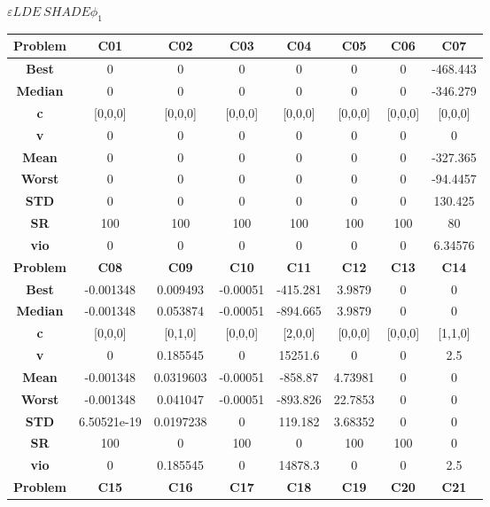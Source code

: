 \documentclass{IEEEtran}
\begin{document}
\begin{center}
$\varepsilon LDE\ SHADE \phi_1$\\
  \begin{tabular}{|c|c|c|c|c|c|c|c|}
    \hline 
    \textbf{Problem} & \textbf{C01} & \textbf{C02} & \textbf{C03} & \textbf{C04} & \textbf{C05} & \textbf{C06} & \textbf{C07} \\ 
    \hline\hline 
    \textbf{Best} & 0 & 0 & 0 & 0 & 0 & 0 & -468.443\\ 
    \textbf{Median} & 0 & 0 & 0 & 0 & 0 & 0 & -346.279\\ 
    \textbf{c} & [0,0,0] & [0,0,0] & [0,0,0] & [0,0,0] & [0,0,0] & [0,0,0] & [0,0,0]\\ 
    \textbf{v} & 0 & 0 & 0 & 0 & 0 & 0 & 0\\ 
    \textbf{Mean} & 0 & 0 & 0 & 0 & 0 & 0 & -327.365\\ 
    \textbf{Worst} & 0 & 0 & 0 & 0 & 0 & 0 & -94.4457\\ 
    \textbf{STD} & 0 & 0 & 0 & 0 & 0 & 0 & 130.425\\ 
    \textbf{SR} & 100 & 100 & 100 & 100 & 100 & 100 & 80\\ 
    \textbf{vio} & 0 & 0 & 0 & 0 & 0 & 0 & 6.34576\\ 
    \hline 
    \hline 
    \textbf{Problem} & \textbf{C08} & \textbf{C09} & \textbf{C10} & \textbf{C11} & \textbf{C12} & \textbf{C13} & \textbf{C14} \\ 
    \hline\hline 
    \textbf{Best} & -0.001348 & 0.009493 & -0.00051 & -415.281 & 3.9879 & 0 & 0\\ 
    \textbf{Median} & -0.001348 & 0.053874 & -0.00051 & -894.665 & 3.9879 & 0 & 0\\ 
    \textbf{c} & [0,0,0] & [0,1,0] & [0,0,0] & [2,0,0] & [0,0,0] & [0,0,0] & [1,1,0]\\ 
    \textbf{v} & 0 & 0.185545 & 0 & 15251.6 & 0 & 0 & 2.5\\ 
    \textbf{Mean} & -0.001348 & 0.0319603 & -0.00051 & -858.87 & 4.73981 & 0 & 0\\ 
    \textbf{Worst} & -0.001348 & 0.041047 & -0.00051 & -893.826 & 22.7853 & 0 & 0\\ 
    \textbf{STD} & 6.50521e-19 & 0.0197238 & 0 & 119.182 & 3.68352 & 0 & 0\\ 
    \textbf{SR} & 100 & 0 & 100 & 0 & 100 & 100 & 0\\ 
    \textbf{vio} & 0 & 0.185545 & 0 & 14878.3 & 0 & 0 & 2.5\\ 
    \hline 
    \hline 
    \textbf{Problem} & \textbf{C15} & \textbf{C16} & \textbf{C17} & \textbf{C18} & \textbf{C19} & \textbf{C20} & \textbf{C21} \\ 

\end{tabular}
\end{center}
\end{document}
